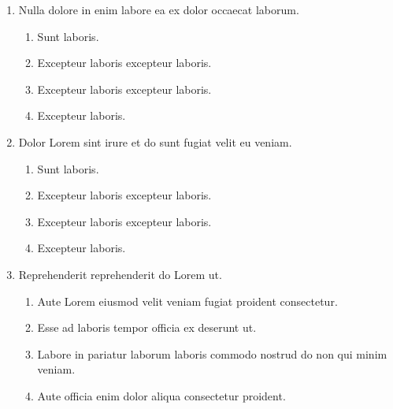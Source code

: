 \documentclass[a4paper,12pt]{article}
\begin{document}
\begin{enumerate}[label=\textbf{\arabic*.}]
\begin{multicols}{2}
\end{multicols}
\item Nulla dolore in enim labore ea ex dolor occaecat laborum.
\begin{multicols}{2}
	\begin{enumerate}
		\item  Sunt laboris.
    
		\item  Excepteur laboris excepteur laboris.
    
		\item  Excepteur laboris excepteur laboris.
  
		\item  Excepteur laboris.
    
	\end{enumerate}

\end{multicols}
\item Dolor Lorem sint irure et do sunt fugiat velit eu veniam.
\begin{multicols}{2}
	\begin{enumerate}
		\item  Sunt laboris.
    
		\item  Excepteur laboris excepteur laboris.
    
		\item  Excepteur laboris excepteur laboris.
  
		\item  Excepteur laboris.
    
	\end{enumerate}

\end{multicols}
\item Reprehenderit reprehenderit do Lorem ut.
\begin{multicols}{2}
	\begin{enumerate}
		\item  Aute Lorem eiusmod velit veniam fugiat proident consectetur.
  
		\item  Esse ad laboris tempor officia ex deserunt ut.
    
		\item  Labore in pariatur laborum laboris commodo nostrud do non qui minim veniam.
    
		\item  Aute officia enim dolor aliqua consectetur proident.
    
	\end{enumerate}


\end{multicols}
\end{enumerate}
\end{document}

